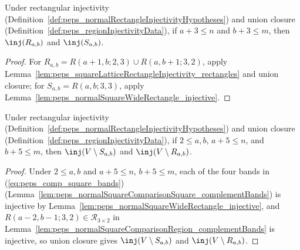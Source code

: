 \begin{lemma}%
    \label{lem:peps_normalSquareComparison_injective}
    \leanok
    Under rectangular injectivity
    (Definition~\ref{def:peps_normalRectangleInjectivityHypotheses}) and union
    closure (Definition~\ref{def:peps_regionInjectivityData}), if
    $a+3\le n$ and $b+3\le m$, then $\inj(R_{a,b})$ and $\inj(S_{a,b})$.
\end{lemma}
\begin{proof}\leanok
    For $R_{a,b}=R(a+1,b;2,3)\cup R(a,b+1;3,2)$, apply
    Lemma~\ref{lem:peps_squareLatticeRectangleInjectivity_rectangles} and union
    closure; for $S_{a,b}=R(a,b;3,3)$, apply
    Lemma~\ref{lem:peps_normalSquareWideRectangle_injective}.
\end{proof}

\begin{lemma}%
    \label{lem:peps_normalSquareComparison_complement_injective}
    \leanok
    Under rectangular injectivity
    (Definition~\ref{def:peps_normalRectangleInjectivityHypotheses}) and union
    closure (Definition~\ref{def:peps_regionInjectivityData}), if $2\le a,b$,
    $a+5\le n$, and $b+5\le m$, then $\inj(V\setminus S_{a,b})$ and
    $\inj(V\setminus R_{a,b})$.
\end{lemma}
\begin{proof}\leanok
    Under $2\le a,b$ and $a+5\le n$, $b+5\le m$, each of the four bands in
    (\ref{eq:peps_comp_square_bands})
    (Lemma~\ref{lem:peps_normalSquareComparisonSquare_complementBands}) is
    injective by Lemma~\ref{lem:peps_normalSquareWideRectangle_injective}, and
    $R(a-2,b-1;3,2)\in\mathcal R_{3\times 2}$ in
    Lemma~\ref{lem:peps_normalSquareComparisonRegion_complementBands} is
    injective, so union closure gives $\inj(V\setminus S_{a,b})$ and
    $\inj(V\setminus R_{a,b})$.
\end{proof}

